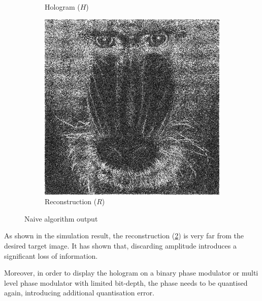 \begin{figure}[H]
\begin{subfigure}[t]{0.3\textwidth}
    \caption{Hologram ($H$)}
    \label{fig:Naive_output_holo}
  \end{subfigure}
  \hfill
  \begin{subfigure}[t]{0.3\textwidth}
    \centering
    \includegraphics[width=\textwidth]{Naive_output_recon.png}
    \caption{Reconstruction ($R$)}
    \label{fig:Naive_output_recon}
  \end{subfigure}
  \caption{Naive algorithm output}
  \label{fig:Naive algorithm output}
\end{figure}

As shown in the simulation result, the reconstruction (\cref{fig:Naive_output_recon}) is very far from the desired target image. It has shown that, discarding amplitude introduces a significant loss of information.

Moreover, in order to display the hologram on a binary phase modulator or multi level phase modulator with limited bit-depth, the phase needs to be quantised again, introducing additional quantisation error.


